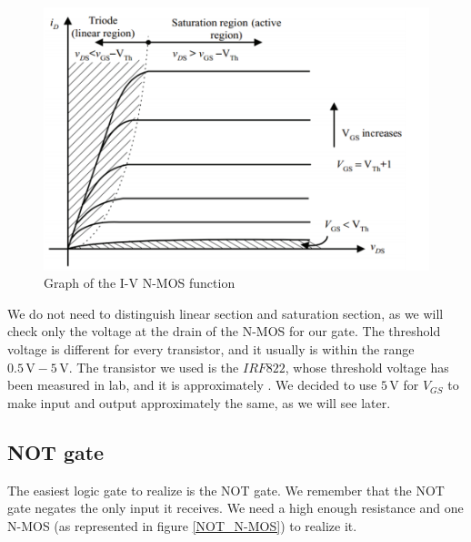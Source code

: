 \documentclass{article}
\begin{document}
\begin{figure}[h]
    \centering
    \includegraphics[scale=.65]{IM_NMOS_Function.png}
    \caption{Graph of the I-V N-MOS function}
    \label{NMOS_Function}
\end{figure}

\vspace{3mm}

We do not need to distinguish linear section and saturation section, as we will check only the voltage at the drain of the N-MOS for our gate. The threshold voltage is different for every transistor, and it usually is within the range $0.5\,\textrm{V} - 5\,\textrm{V}$. The transistor we used is the $IRF822$, whose threshold voltage has been measured in lab, and it is approximately %
. We decided to use $5\,\textrm{V}$ for $V_{GS}$ to make input and output approximately the same, as we will see later.


\clearpage


\subsection{NOT gate}

The easiest logic gate to realize is the NOT gate. We remember that the NOT gate negates the only input it receives. We need a high enough resistance and one N-MOS (as represented in figure \ref{NOT_N-MOS}) to realize it.
\end{document}
